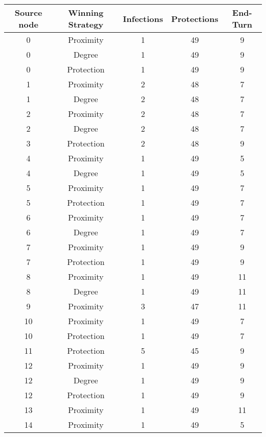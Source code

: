 \documentclass[results.tex]{subfiles}
\begin{document}
\begin{center}
  \begin{tabular}{| c || c | c | c | c |}
    \hline
    {\bfseries Source node} & {\bfseries Winning Strategy} & {\bfseries Infections} & {\bfseries Protections} & {\bfseries End-Turn} \\  %
    \hline\hline
    0 & Proximity & 1 & 49 & 9 \\ 
    \hline
    0 & Degree & 1 & 49 & 9 \\ 
    \hline
    0 & Protection & 1 & 49 & 9 \\ 
    \hline
    1 & Proximity & 2 & 48 & 7 \\ 
    \hline
    1 & Degree & 2 & 48 & 7 \\ 
    \hline
    2 & Proximity & 2 & 48 & 7 \\ 
    \hline
    2 & Degree & 2 & 48 & 7 \\ 
    \hline
    3 & Protection & 2 & 48 & 9 \\ 
    \hline
    4 & Proximity & 1 & 49 & 5 \\ 
    \hline
    4 & Degree & 1 & 49 & 5 \\ 
    \hline
    5 & Proximity & 1 & 49 & 7 \\ 
    \hline
    5 & Protection & 1 & 49 & 7 \\ 
    \hline
    6 & Proximity & 1 & 49 & 7 \\ 
    \hline
    6 & Degree & 1 & 49 & 7 \\ 
    \hline
    7 & Proximity & 1 & 49 & 9 \\ 
    \hline
    7 & Protection & 1 & 49 & 9 \\ 
    \hline
    8 & Proximity & 1 & 49 & 11 \\ 
    \hline
    8 & Degree & 1 & 49 & 11 \\ 
    \hline
    9 & Proximity & 3 & 47 & 11 \\ 
    \hline
    10 & Proximity & 1 & 49 & 7 \\ 
    \hline
    10 & Protection & 1 & 49 & 7 \\ 
    \hline
    11 & Protection & 5 & 45 & 9 \\ 
    \hline
    12 & Proximity & 1 & 49 & 9 \\ 
    \hline
    12 & Degree & 1 & 49 & 9 \\ 
    \hline
    12 & Protection & 1 & 49 & 9 \\ 
    \hline
    13 & Proximity & 1 & 49 & 11 \\ 
    \hline
    14 & Proximity & 1 & 49 & 5 \\ 

\end{tabular}
\end{center}
\end{document}
